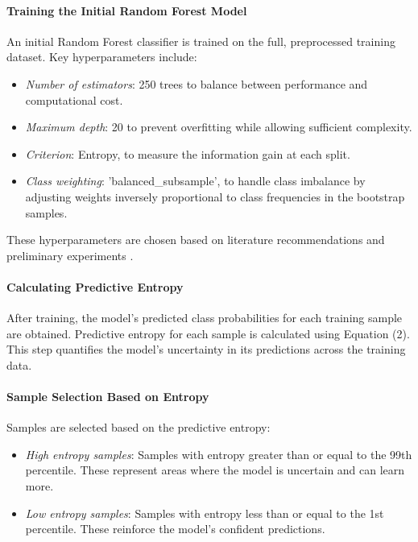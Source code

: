 \documentclass{article}
\begin{document}
\paragraph{Training the Initial Random Forest Model}

An initial Random Forest classifier is trained on the full, preprocessed training dataset. Key hyperparameters include:

\begin{itemize}
    \item \textit{Number of estimators}: 250 trees to balance between performance and computational cost.
    \item \textit{Maximum depth}: 20 to prevent overfitting while allowing sufficient complexity.
    \item \textit{Criterion}: Entropy, to measure the information gain at each split.
    \item \textit{Class weighting}: 'balanced\_subsample', to handle class imbalance by adjusting weights inversely proportional to class frequencies in the bootstrap samples.
\end{itemize}

These hyperparameters are chosen based on literature recommendations and preliminary experiments \cite{liaw2002classification}.

\paragraph{Calculating Predictive Entropy}

After training, the model's predicted class probabilities for each training sample are obtained. Predictive entropy for each sample is calculated using Equation (2). This step quantifies the model's uncertainty in its predictions across the training data.

\paragraph{Sample Selection Based on Entropy}

Samples are selected based on the predictive entropy:

\begin{itemize}
    \item \textit{High entropy samples}: Samples with entropy greater than or equal to the 99th percentile. These represent areas where the model is uncertain and can learn more.
    \item \textit{Low entropy samples}: Samples with entropy less than or equal to the 1st percentile. These reinforce the model's confident predictions.
\end{itemize}
\end{document}
